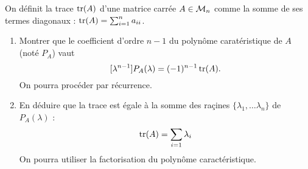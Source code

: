 \begin{exercise} \label{exo:AlgLin-Trace}
  On définit la trace $\operatorname{tr}(A)$ d'une matrice carrée $A \in \mathcal{M}_n$ comme la somme de ses termes diagonaux : $\operatorname{tr}(A) = \sum_{i=1}^n a_{ii}$.
  \begin{enumerate}
   \item Montrer que le coefficient d'ordre $n-1$ du polynôme caratéristique de $A$ (noté $P_A$) vaut
  $$
  [\lambda^{n-1}] P_A(\lambda) = (-1)^{n-1} \operatorname{tr}(A).
  $$
  On pourra procéder par récurrence.
  \item En déduire que la trace est égale à la somme des raçines $\{\lambda_1, \dots \lambda_n\}$ de $P_A(\lambda)$ :
  $$
  \operatorname{tr}(A) = \sum_{i=1} \lambda_i
  $$
  On pourra utiliser la factorisation du polynôme caractéristique.
  \end{enumerate}
\end{exercise}

